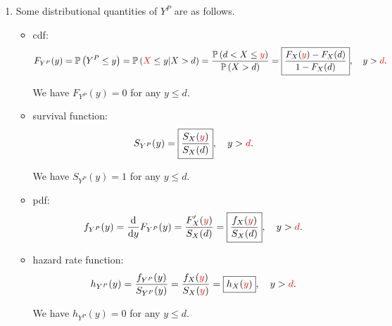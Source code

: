 \begin{enumerate}
\item \label{it:fran-yp-dist-quantities}
Some distributional quantities of \(Y^P\) are as follows.
\begin{itemize}
\item cdf: \[
F_{Y^P}(y)=\mathbb{P}\left(Y^P\le y\right)=\mathbb{P}\left({\color{red}X}\le y|X>d\right)=\frac{\mathbb{P}\left(d<X\le {\color{red}y}\right)}{\mathbb{P}\left(X>d\right)}
=\boxed{\frac{F_X({\color{red}y})-F_X(d)}{1-F_X(d)}},\quad y>{\color{red}d}.
\]
\begin{note}
We have \(F_{Y^P}(y)=0\) for any \(y\le d\).
\end{note}

\item survival function:
\[
S_{Y^P}(y)
=\boxed{\frac{S_X({\color{red}y})}{S_X(d)}},\quad y>{\color{red}d}.
\]
\begin{note}
We have \(S_{Y^P}(y)=1\) for any \(y\le d\).
\end{note}

\item pdf:
\[
f_{Y^P}(y)=\dv{}{y}F_{Y^P}(y)
=\frac{\displaystyle F_X'({\color{red}y})}{S_X(d)}
=\boxed{\frac{f_X({\color{red}y})}{S_X(d)}},\quad y>{\color{red}d}.
\]
\item hazard rate function:
\[
h_{Y^P}(y)=\frac{f_{Y^P}(y)}{S_{Y^P}(y)}=\frac{f_X({\color{red}y})}{S_X({\color{red}y})}=\boxed{h_X({\color{red}y})},\quad y>{\color{red}d}.
\]
\begin{note}
We have \(h_{Y^P}(y)=0\) for any \(y\le d\).
\end{note}
\end{itemize}


\end{enumerate}

